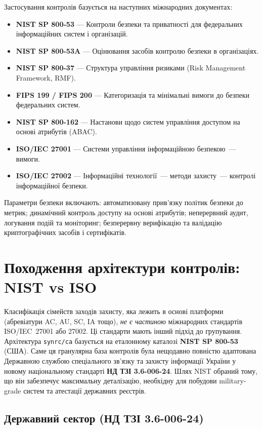 Застосування контролів базується на наступних міжнародних документах:

\begin{itemize}
    \item \textbf{NIST SP 800-53} --- Контроли безпеки та приватності для федеральних інформаційних систем і організацій.
    \item \textbf{NIST SP 800-53A} --- Оцінювання засобів контролю безпеки в організаціях.
    \item \textbf{NIST SP 800-37} --- Структура управління ризиками (Risk Management Framework, RMF).
    \item \textbf{FIPS 199 / FIPS 200} --- Категоризація та мінімальні вимоги до безпеки федеральних систем.
    \item \textbf{NIST SP 800-162} --- Настанови щодо систем управління доступом на основі атрибутів (ABAC).
    \item \textbf{ISO/IEC 27001} --- Системи управління інформаційною безпекою~--- вимоги.
    \item \textbf{ISO/IEC 27002} --- Інформаційні технології~--- методи захисту~--- контролі інформаційної безпеки.
\end{itemize}

Параметри безпеки включають: автоматизовану прив'язку політик безпеки до метрик;
динамічний контроль доступу на основі атрибутів; неперервний аудит, логування подій та моніторинг;
безперервну верифікацію та валідацію криптографічних засобів і сертифікатів.

\section{Походження архітектури контролів: NIST vs ISO}

Класифікація сімейств заходів захисту, яка лежить в основі платформи (абревіатури AC, AU, SC,
IA тощо), \emph{не є частиною} міжнародних стандартів ISO/IEC~27001 або 27002. Ці стандарти мають
інший підхід до групування. Архітектура \texttt{synrc/ca} базується на еталонному каталозі
\textbf{NIST SP 800-53} (США). Саме ця гранулярна база контролів була нещодавно повністю
адаптована Державною службою спеціального зв'язку та захисту інформації України у новому
національному стандарті \textbf{НД ТЗІ 3.6-006-24}. Шлях NIST обраний тому, що він забезпечує
максимальну деталізацію, необхідну для побудови military-grade систем та атестації державних реєстрів.

\subsection{Державний сектор (НД ТЗІ 3.6-006-24)}

